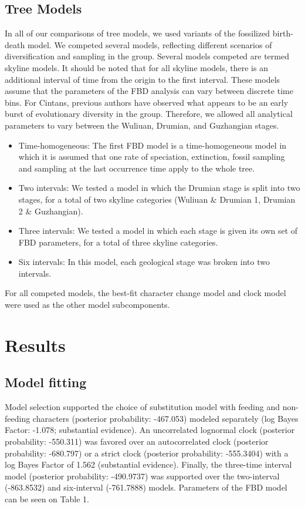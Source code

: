\documentclass{article}
\begin{document}
\subsection{Tree Models}

In all of our comparisons of tree models, we used variants of the fossilized birth-death model. 
We competed several models, reflecting different scenarios of diversification and sampling in the group.
Several models competed are termed skyline models.
It should be noted that for all skyline models, there is an additional interval of time from the origin to the first interval.
These models assume that the parameters of the FBD analysis can vary between discrete time bins.
For Cintans, previous authors have observed what appears to be an early burst of evolutionary diversity in the group.
Therefore, we allowed all analytical parameters to vary between the Wuliuan, Drumian, and Guzhangian stages.

\begin{itemize}
\item Time-homogeneous: The first FBD model is a time-homogeneous model in which it is assumed that one rate of speciation, extinction, fossil sampling and sampling at the last occurrence time apply to the whole tree. 
\item Two intervals: We tested a model in which the Drumian stage is split into two stages, for a total of two skyline categories (Wuliuan \& Drumian 1, Drumian 2 \& Guzhangian).
\item Three intervals: We tested a model in which each stage is given its own set of FBD parameters, for a total of three skyline categories.
\item Six intervals: In this model, each geological stage was broken into two intervals.
\end{itemize}
For all competed models, the best-fit character change model and clock model were used as the other model subcomponents.

\section{Results}

\subsection{Model fitting}

Model selection supported the choice of substitution model with feeding and non-feeding characters (posterior probability: -467.053) modeled separately (log Bayes Factor: -1.078; substantial evidence).
An uncorrelated lognormal clock (posterior probability: -550.311) was favored over an autocorrelated clock (posterior probability: -680.797) or a strict clock (posterior probability: -555.3404) with a log Bayes Factor of 1.562 (substantial evidence).
Finally, the three-time interval model (posterior probability: -490.9737) was supported over the two-interval (-863.8532) and six-interval (-761.7888) models. 
Parameters of the FBD model can be seen on Table 1.
\end{document}
